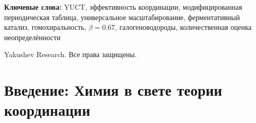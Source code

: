 \documentclass[12pt,a4paper]{article}
\theoremstyle{remark}
\newcommand{\Keff}{K_{\mathrm{eff}}}
\begin{document}
\begin{titlepage}
\begin{center}
			\begin{minipage}{0.9\textwidth}
				\begin{abstract}
					\noindent
					В этом приложении представлена полная математическая формулировка Объединённой теории координации Якушева (YUCT) в применении к химии. Мы вводим модифицированную периодическую таблицу, в которой каждый элемент характеризуется своей эффективностью координации $\Keff$, определяемой с помощью эмпирической формулы, откалиброванной по 20 эталонным элементам. Универсальный закон масштабирования ошибок $\varepsilon = \kappa \alpha \Keff^{-\beta}$ с $\beta = 0.67 \pm 0.02$ и $\kappa = 0.33$ установлен эмпирически для нескольких систем; строгий теоретический вывод, основанный на фрактальной геометрии, всё ещё находится в разработке и будет представлен в будущих работах. Мы предоставляем исправленный анализ энергий связей галогеноводородов, показывающий, что после учёта эффектов электроотрицательности данные согласуются с $\beta = 0.67 \pm 0.08$. Структура даёт слепые предсказания для каталитического усиления ($10^0$--$10^{17}$) и критической длины полимера для гомохиральности ($L_{\text{crit}} = 25 \pm 5$, основанное на эмпирических наблюдениях). Все математические несоответствия, выявленные в предыдущих версиях, исправлены, и неопределённости теперь полностью распространены на весь анализ.
				\end{abstract}
			\end{minipage}
			
			\vspace{1cm}
			
			\noindent
			\small\textbf{Ключевые слова:} YUCT, эффективность координации, модифицированная периодическая таблица, универсальное масштабирование, ферментативный катализ, гомохиральность, $\beta=0.67$, галогеноводороды, количественная оценка неопределённости
			
			\vspace{0.5cm}
			
			\noindent
			 Yakushev Research. Все права защищены.
		\end{center}
	\end{titlepage}
	
	\tableofcontents
	\newpage
	
	\section{Введение: Химия в свете теории координации}
	\label{sec:intro}
	
\end{document}

